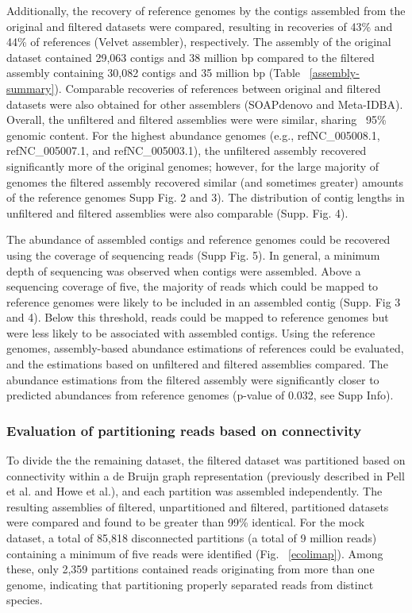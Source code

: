 \documentclass[11pt]{article} %
\begin{document}
Additionally, the recovery of reference genomes by the contigs
assembled from the original and filtered datasets were compared,
resulting in recoveries of 43\% and 44\% of references (Velvet
assembler), respectively.  The assembly of the original dataset
contained 29,063 contigs and 38 million bp compared to the filtered
assembly containing 30,082 contigs and 35 million bp (Table
~\ref{assembly-summary}).  Comparable recoveries of references between
original and filtered datasets were also obtained for other assemblers
(SOAPdenovo and Meta-IDBA).  Overall, the unfiltered and filtered
assemblies were were similar, sharing ~95\% genomic content.  For the
highest abundance genomes (e.g., ref\textbar{}NC\_005008.1,
ref\textbar{}NC\_005007.1, and ref\textbar{}NC\_005003.1), the
unfiltered assembly recovered significantly more of the original
genomes; however, for the large majority of genomes the filtered
assembly recovered similar (and sometimes greater) amounts of the
reference genomes Supp Fig. 2 and 3).  The distribution of contig
lengths in unfiltered and filtered assemblies were also comparable
(Supp. Fig. 4).

The abundance of assembled contigs and reference genomes could be
recovered using the coverage of sequencing reads (Supp Fig. 5). 
In general, a minimum depth of sequencing
was observed when contigs were assembled. Above a sequencing coverage
of five, the majority of reads which could be mapped to reference
genomes were likely to be included in an assembled contig (Supp. Fig 3 and 4).  
Below this threshold, reads could be mapped
to reference genomes but were less likely to be associated with
assembled contigs.  Using the reference genomes, assembly-based
abundance estimations of references could be evaluated, and the
estimations based on unfiltered and filtered assemblies compared.  The
abundance estimations from the filtered assembly were significantly
closer to predicted abundances from reference genomes (p-value of
0.032, see Supp Info).

\subsubsection{Evaluation of partitioning reads based on connectivity}
To divide the the remaining dataset, the filtered dataset was
partitioned based on connectivity within a de Bruijn graph
representation (previously described in Pell et al. and Howe et al.),
and each partition was assembled independently.  The resulting
assemblies of filtered, unpartitioned and filtered, partitioned
datasets were compared and found to be greater than 99\% identical.
For the mock dataset, a total of 85,818 disconnected partitions (a
total of 9 million reads) containing a minimum of five reads were
identified (Fig. ~\ref{ecolimap}).  Among these, only 2,359 partitions
contained reads originating from more than one genome, indicating that
partitioning properly separated reads from distinct species.
\end{document}
